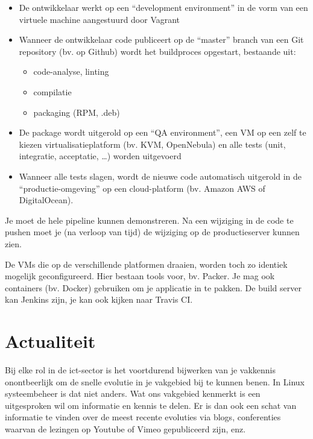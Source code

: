 \begin{itemize}
\item De ontwikkelaar werkt op een ``development environment'' in de vorm van een virtuele machine aangestuurd door Vagrant
\item Wanneer de ontwikkelaar code publiceert op de ``master'' branch van een Git repository (bv. op Github) wordt het buildproces opgestart, bestaande uit:

  \begin{itemize}
  \item code-analyse, linting
  \item compilatie
  \item packaging (RPM, .deb)
  \end{itemize}

\item De package wordt uitgerold op een ``QA environment'', een VM op een zelf te kiezen virtualisatieplatform (bv. KVM, OpenNebula) en alle tests (unit, integratie, acceptatie, \ldots{}) worden uitgevoerd
\item Wanneer alle tests slagen, wordt de nieuwe code automatisch uitgerold in de ``productie-omgeving'' op een cloud-platform (bv. Amazon AWS of DigitalOcean).
\end{itemize}

Je moet de hele pipeline kunnen demonstreren. Na een wijziging in de code te pushen moet je (na verloop van tijd) de wijziging op de productieserver kunnen zien.

De VMs die op de verschillende platformen draaien, worden toch zo identiek mogelijk geconfigureerd. Hier bestaan tools voor, bv. Packer.  Je mag ook containers (bv. Docker) gebruiken om je applicatie in te pakken. De build server kan Jenkins zijn, je kan ook kijken naar Travis CI.

\section{Actualiteit}
\label{actualiteit}

Bij elke rol in de ict-sector is het voortdurend bijwerken van je vakkennis onontbeerlijk om de snelle evolutie in je vakgebied bij te kunnen benen. In Linux systeembeheer is dat niet anders. Wat ons vakgebied kenmerkt is een uitgesproken wil om informatie en kennis te delen. Er is dan ook een schat van informatie te vinden over de meest recente evoluties via blogs, conferenties waarvan de lezingen op Youtube of Vimeo gepubliceerd zijn, enz.

